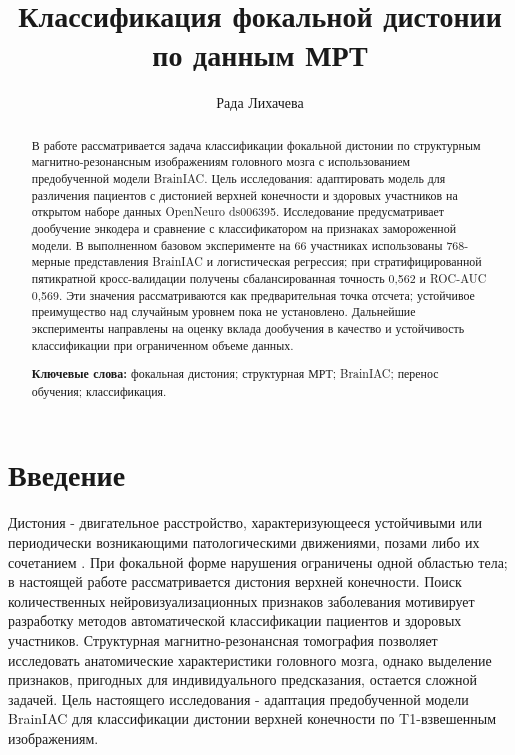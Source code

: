 \documentclass[11pt,a4paper]{article}
\title{Классификация фокальной дистонии по данным МРТ}
\author{Рада Лихачева}
\date{}
\begin{document}
\maketitle
\begin{abstract}

В работе рассматривается задача классификации фокальной дистонии по структурным магнитно-резонансным изображениям головного мозга с использованием предобученной модели BrainIAC. Цель исследования: адаптировать модель для различения пациентов с дистонией верхней конечности и здоровых участников на открытом наборе данных OpenNeuro ds006395. Исследование предусматривает дообучение энкодера и сравнение с классификатором на признаках замороженной модели. В выполненном базовом эксперименте на 66 участниках использованы 768-мерные представления BrainIAC и логистическая регрессия; при стратифицированной пятикратной кросс-валидации получены сбалансированная точность 0,562 и ROC-AUC 0,569. Эти значения рассматриваются как предварительная точка отсчета; устойчивое преимущество над случайным уровнем пока не установлено. Дальнейшие эксперименты направлены на оценку вклада дообучения в качество и устойчивость классификации при ограниченном объеме данных.

\textbf{Ключевые слова:} фокальная дистония; структурная МРТ; BrainIAC; перенос обучения; классификация.

\end{abstract}
\section{Введение}

Дистония - двигательное расстройство, характеризующееся устойчивыми или периодически возникающими патологическими движениями, позами либо их сочетанием \cite{ref29}. При фокальной форме нарушения ограничены одной областью тела; в настоящей работе рассматривается дистония верхней конечности. Поиск количественных нейровизуализационных признаков заболевания мотивирует разработку методов автоматической классификации пациентов и здоровых участников. Структурная магнитно-резонансная томография позволяет исследовать анатомические характеристики головного мозга, однако выделение признаков, пригодных для индивидуального предсказания, остается сложной задачей. Цель настоящего исследования - адаптация предобученной модели BrainIAC для классификации дистонии верхней конечности по T1-взвешенным изображениям.
\end{document}
